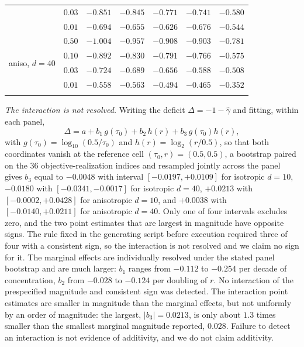 \documentclass[pdflatex,sn-mathphys-num]{sn-jnl}
\theoremstyle{thmstyleone}
\theoremstyle{thmstyletwo}
\theoremstyle{thmstylethree}
\begin{document}
\begin{table}[h]
\begin{tabular}{@{}llccccc@{}}
 & $0.03$ & $-0.851$ & $-0.845$ & $-0.771$ & $-0.741$ & $-0.580$\\
 & $0.01$ & $-0.694$ & $-0.655$ & $-0.626$ & $-0.676$ & $-0.544$\\
\midrule
\multirow{4}{*}{aniso, $d=40$}
 & $0.50$ & $-1.004$ & $-0.957$ & $-0.908$ & $-0.903$ & $-0.781$\\
 & $0.10$ & $-0.892$ & $-0.830$ & $-0.791$ & $-0.766$ & $-0.575$\\
 & $0.03$ & $-0.724$ & $-0.689$ & $-0.656$ & $-0.588$ & $-0.508$\\
 & $0.01$ & $-0.558$ & $-0.563$ & $-0.494$ & $-0.465$ & $-0.352$\\
\botrule
\end{tabular}
\end{table}

\emph{The interaction is not resolved.} Writing the deficit $\Delta=-1-\hat\gamma$ and fitting, within each panel,
\[
\Delta = a + b_1\,g(\tau_0) + b_2\,h(r) + b_3\,g(\tau_0)h(r),
\]
with $g(\tau_0)=\log_{10}(0.5/\tau_0)$ and $h(r)=\log_2(r/0.5)$,
so that both coordinates vanish at the reference cell $(\tau_0,r)=(0.5,0.5)$, a bootstrap paired on the $36$ objective-realization indices and resampled jointly across the panel gives $b_3$ equal to $-0.0048$ with interval $[-0.0197,+0.0109]$ for isotropic $d=10$, $-0.0180$ with $[-0.0341,-0.0017]$ for isotropic $d=40$, $+0.0213$ with $[-0.0002,+0.0428]$ for anisotropic $d=10$, and $+0.0038$ with $[-0.0140,+0.0211]$ for anisotropic $d=40$. Only one of four intervals excludes zero, and the two point estimates that are largest in magnitude have opposite signs. The rule fixed in the generating script before execution required three of four with a consistent sign, so the interaction is not resolved and we claim no sign for it. The marginal effects are individually resolved under the stated panel bootstrap and are much larger: $b_1$ ranges from $-0.112$ to $-0.254$ per decade of concentration, $b_2$ from $-0.028$ to $-0.124$ per doubling of $r$. No interaction of the prespecified magnitude and consistent sign was detected. The interaction point estimates are smaller in magnitude than the marginal effects, but not uniformly by an order of magnitude: the largest, $|b_3|=0.0213$, is only about $1.3$ times smaller than the smallest marginal magnitude reported, $0.028$. Failure to detect an interaction is not evidence of additivity, and we do not claim additivity.
\end{document}
